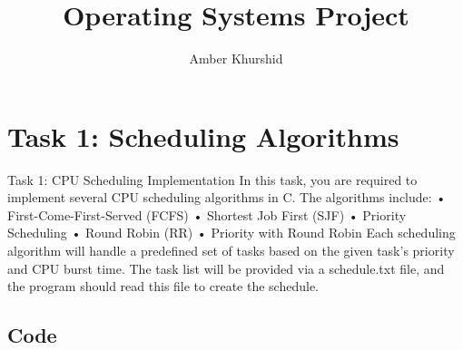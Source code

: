 \documentclass[12pt]{article}
\title{Operating Systems Project }
\author{Amber  Khurshid}
\begin{document}
\maketitle



\section{Task 1: Scheduling Algorithms}

Task 1: CPU Scheduling Implementation
In this task, you are required to implement several CPU scheduling algorithms in C. The
algorithms include:
• First-Come-First-Served (FCFS)
• Shortest Job First (SJF)
• Priority Scheduling
• Round Robin (RR)
• Priority with Round Robin
Each scheduling algorithm will handle a predefined set of tasks based on the given
task’s priority and CPU burst time. The task list will be provided via a schedule.txt
file, and the program should read this file to create the schedule.



\subsection{Code}
\end{document}
